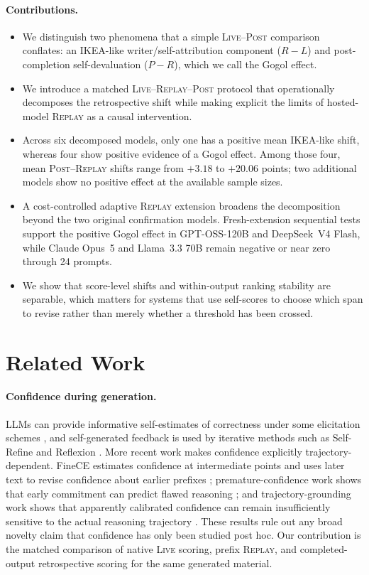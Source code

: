 \documentclass[10pt]{article}
\newcommand{\live}{\textsc{Live}}
\newcommand{\replay}{\textsc{Replay}}
\newcommand{\post}{\textsc{Post}}
\newcommand{\papersection}[1]{\Needspace{4.4\baselineskip}\section{#1}}
\begin{document}
\paragraph{Contributions.}
\begin{itemize}
    \item We distinguish two phenomena that a simple \live{}--\post{} comparison conflates: an IKEA-like writer/self-attribution component ($R-L$) and post-completion self-devaluation ($P-R$), which we call the Gogol effect.
    \item We introduce a matched \live{}--\replay{}--\post{} protocol that operationally decomposes the retrospective shift while making explicit the limits of hosted-model \replay{} as a causal intervention.
    \item Across six decomposed models, only one has a positive mean IKEA-like shift, whereas four show positive evidence of a Gogol effect. Among those four, mean \post{}--\replay{} shifts range from $+3.18$ to $+20.06$ points; two additional models show no positive effect at the available sample sizes.
    \item A cost-controlled adaptive \replay{} extension broadens the decomposition beyond the two original confirmation models. Fresh-extension sequential tests support the positive Gogol effect in GPT-OSS-120B and DeepSeek~V4 Flash, while Claude Opus~5 and Llama~3.3 70B remain negative or near zero through 24 prompts.
    \item We show that score-level shifts and within-output ranking stability are separable, which matters for systems that use self-scores to choose which span to revise rather than merely whether a threshold has been crossed.
\end{itemize}

\papersection{Related Work}
\paragraph{Confidence during generation.}
LLMs can provide informative self-estimates of correctness under some elicitation schemes \citep{kadavath2022know}, and self-generated feedback is used by iterative methods such as Self-Refine and Reflexion \citep{madaan2023selfrefine,shinn2023reflexion}. More recent work makes confidence explicitly trajectory-dependent. FineCE estimates confidence at intermediate points and uses later text to revise confidence about earlier prefixes \citep{han2025finece}; premature-confidence work shows that early commitment can predict flawed reasoning \citep{gai2026premature}; and trajectory-grounding work shows that apparently calibrated confidence can remain insufficiently sensitive to the actual reasoning trajectory \citep{yang2026mirage}. These results rule out any broad novelty claim that confidence has only been studied post hoc. Our contribution is the matched comparison of native \live{} scoring, prefix \replay{}, and completed-output retrospective scoring for the same generated material.
\end{document}
